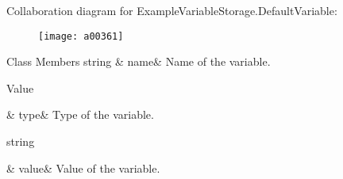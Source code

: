 Collaboration diagram for Example\-Variable\-Storage.\-Default\-Variable\-:
\nopagebreak
\begin{figure}[H]
\begin{center}
\leavevmode
\texttt{[image: a00361]}
\end{center}
\end{figure}
\begin{DoxyFields}{Class Members}
\hypertarget{a00087_a609feaa53936e7dc42248ff2ba68454a}{string}\label{a00087_a609feaa53936e7dc42248ff2ba68454a}
&
name&
Name of the variable. \\
\hline

\hypertarget{a00087_a904347efdca12f40243c7dedb646153d}{Value}\label{a00087_a904347efdca12f40243c7dedb646153d}
&
type&
Type of the variable. \\
\hline

\hypertarget{a00087_a0f00ecb21b58aa754a4bbb61edf62818}{string}\label{a00087_a0f00ecb21b58aa754a4bbb61edf62818}
&
value&
Value of the variable. \\
\hline

\end{DoxyFields}
